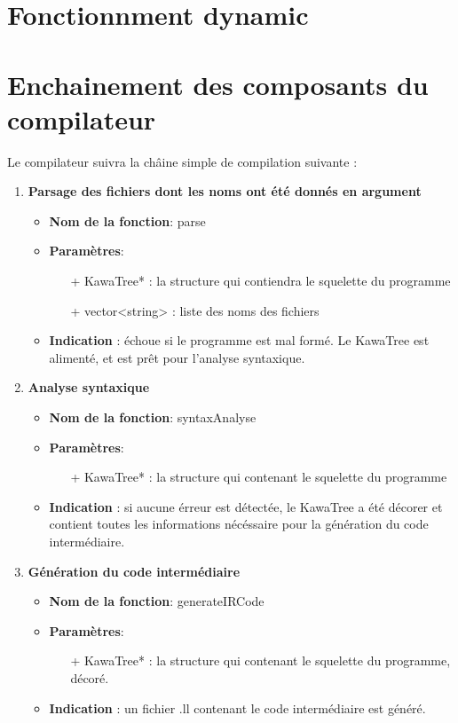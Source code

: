 \documentclass{article}
\begin{document}
\section{Fonctionnment dynamic}

\section{Enchainement des composants du compilateur}

Le compilateur suivra la châine simple de compilation suivante :

   \begin{enumerate}
   \item \textbf{Parsage des fichiers dont les noms ont été donnés en argument}
   \begin{itemize}
     \item \textbf{Nom de la fonction}: parse
     \item \textbf{Paramètres}:
     \begin{enumerate}
       \item[+] KawaTree* : la structure qui contiendra le squelette du programme 
       \item[+] vector<string> : liste des noms des fichiers
     \end{enumerate}
     \item \textbf{Indication} : échoue si le programme est mal formé. Le KawaTree est alimenté, et est prêt pour l'analyse syntaxique.  
   \end{itemize}

   \item \textbf{Analyse syntaxique}
   \begin{itemize}
     \item \textbf{Nom de la fonction}: syntaxAnalyse
     \item \textbf{Paramètres}:
     \begin{enumerate}
       \item[+] KawaTree* : la structure qui contenant le squelette du programme 
     \end{enumerate}
     \item \textbf{Indication} : si aucune érreur est détectée, le KawaTree a été décorer et contient toutes les informations nécéssaire pour la génération du code intermédiaire. 
   \end{itemize}

   \item \textbf{Génération du code intermédiaire}
   \begin{itemize}
     \item \textbf{Nom de la fonction}: generateIRCode
     \item \textbf{Paramètres}:
     \begin{enumerate}
       \item[+] KawaTree* : la structure qui contenant le squelette du programme, décoré.
     \end{enumerate}
     \item \textbf{Indication} : un fichier .ll contenant le code intermédiaire est généré.
   \end{itemize}


\end{enumerate}
\end{document}

